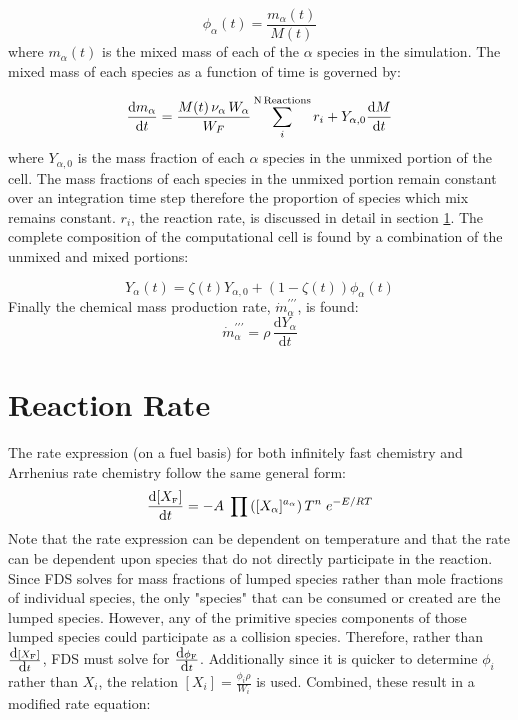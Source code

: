 \begin{equation}\label{eq:phi}
\phi_{\alpha}(t)=\frac{m_{\alpha}(t)}{M(t)}
\end{equation}
where $m_\alpha(t)$ is the mixed mass of each of the $\alpha$ species in the simulation. The mixed mass of each species as a function of time is governed by:

\begin{equation}\label{eq:mixmass}
\frac{\mbox{d}m_{\alpha}}{\mbox{d}t}=\frac{M(t) \, \nu_{\alpha} \, W_{\alpha}}{W_F}\displaystyle \sum_{i}^{\text{N\,Reactions}}r_{i}+Y_{\alpha,0}\frac{\mbox{d}M}{\mbox{d}t} 
\end{equation}
where $Y_{\alpha,0}$ is the mass fraction of each $\alpha$ species in the unmixed portion of the cell. The mass fractions of each species in the unmixed portion remain constant over an integration time step therefore the proportion of species which mix remains constant. $r_{i}$, the reaction rate, is discussed in detail in section \ref{Reaction_Rate_Model}. The complete composition of the computational cell is found by a combination of the unmixed and mixed portions:

\begin{equation}\label{eq:final_comp}
Y_{\alpha}(t)=\zeta(t)Y_{\alpha,0}+(1-\zeta(t))\phi_{\alpha}(t)
\end{equation}
Finally the chemical mass production rate, $\dot{m}^{\prime\prime\prime}_{\alpha}$, is found:
\begin{equation}\label{mass_prod_rate}
\dot{m}^{\prime\prime\prime}_{\alpha}=\rho \,\frac{\mbox{d}Y_{\alpha}}{\mbox{d}t}
\end{equation}

\section{Reaction Rate} 

\label{Reaction_Rate_Model}

The rate expression (on a fuel basis) for both infinitely fast chemistry and Arrhenius rate chemistry follow the same general form:
\begin{equation}\label{eq:Arrheniusrateeqn}
\frac{\mbox{d}[X_{\tiny \hbox{F}}]}{\mbox{d}t} = -A \; \prod \left([X_{\alpha}]^{a_{\alpha}} \right) T^n \; e^{-E/RT} 
\end{equation}
Note that the rate expression can be dependent on temperature and that the rate can be dependent upon species that do not directly participate in the reaction. Since FDS solves for mass fractions of lumped species rather than mole fractions of individual species, the only "species" that can be consumed or created are the lumped species.  However, any of the primitive species components of those lumped species could participate as a collision species.  Therefore, rather than $\frac{\mbox{d}[X_{\tiny \hbox{F}}]}{\mbox{d}t}$,  FDS must solve for $\frac{\mbox{d}\phi_{\tiny \hbox{F}}}{\mbox{d}t}$.  Additionally since it is quicker to determine $\phi_i$ rather than $X_i$, the relation $[X_i]=\frac{\phi_i \rho}{W_i}$ is used.  Combined, these result in a modified rate equation:

